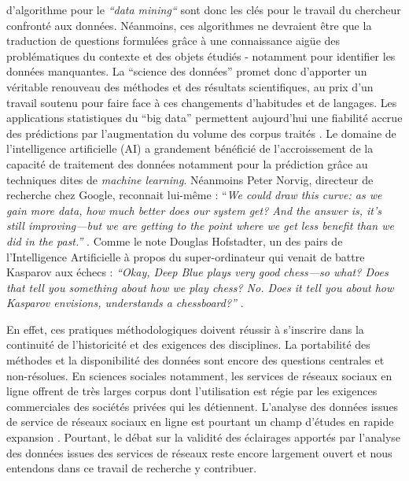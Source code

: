 d{\textquoteright}algorithme pour le \textit{{\textquotedblleft}data mining{\textquotedblleft}} sont donc les clés pour le travail du chercheur confronté aux données. Néanmoins, ces algorithmes ne devraient \^etre que la traduction de questions formulées gr\^ace à une connaissance aig\"ue des problématiques du contexte et des objets étudiés - notamment pour identifier les données manquantes. La {\textquotedblleft}science des données{\textquotedblright} promet donc d{\textquoteright}apporter un véritable renouveau des méthodes et des résultats scientifiques, au prix d{\textquoteright}un travail soutenu pour faire face à ces changements d{\textquoteright}habitudes et de langages. Les applications statistiques du {\textquotedblleft}big data{\textquotedblright} permettent aujourd{\textquoteright}hui une fiabilité accrue des prédictions par l{\textquoteright}augmentation du volume des corpus traités \citep{Breiman2001}. Le domaine de l{\textquoteright}intelligence artificielle (AI) a grandement bénéficié de l{\textquoteright}accroissement de la capacité de traitement des données notamment pour la prédiction gr\^ace au techniques dites de \textit{machine learning}. Néanmoins Peter Norvig, directeur de recherche chez Google, reconnait lui-m\^eme : {\textquotedblleft}\textit{We could draw this curve: as we gain more data, how much better does our system get? And the answer is, it{\textquoteright}s still improving---but we are getting to the point where we get less benefit than we did in the past.{\textquotedblright} }\citep{Somers2013}. Comme le note Douglas Hofstadter, un des pairs de l{\textquoteright}Intelligence Artificielle à propos du super-ordinateur qui venait de battre Kasparov aux échecs : \textit{{\textquotedblleft}Okay, Deep Blue plays very good chess---so what? Does that tell you something about how we play chess? No. Does it tell you about how Kasparov envisions, understands a chessboard?{\textquotedblright} }\citep{Somers2013}.  

En effet, ces pratiques méthodologiques doivent réussir à s{\textquoteright}inscrire dans la continuité de l{\textquoteright}historicité et des exigences des disciplines. La portabilité des méthodes et la disponibilité des données sont encore des questions centrales et non-résolues. En sciences sociales notamment, les services de réseaux sociaux en ligne offrent de très larges corpus dont l{\textquoteright}utilisation est régie par les exigences commerciales des sociétés privées qui les détiennent. L{\textquoteright}analyse des données issues de service de réseaux sociaux en ligne est pourtant un champ d{\textquoteright}études en rapide expansion \citep{Nettleton2013}. Pourtant, le débat sur la validité des éclairages apportés par l{\textquoteright}analyse des données issues des services de réseaux reste encore largement ouvert et nous entendons dans ce travail de recherche y contribuer.  


